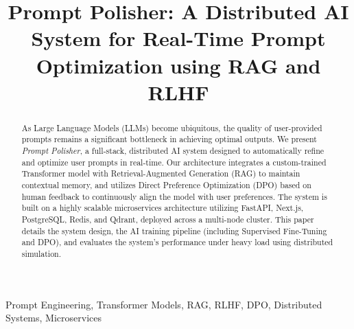 \documentclass[10pt, conference]{IEEEtran}
\begin{document}
\title{Prompt Polisher: A Distributed AI System for Real-Time Prompt Optimization using RAG and RLHF}

\author{
\and
{}
\and
{}
}

\maketitle

\begin{abstract}
As Large Language Models (LLMs) become ubiquitous, the quality of user-provided prompts remains a significant bottleneck in achieving optimal outputs. We present \textit{Prompt Polisher}, a full-stack, distributed AI system designed to automatically refine and optimize user prompts in real-time. Our architecture integrates a custom-trained Transformer model with Retrieval-Augmented Generation (RAG) to maintain contextual memory, and utilizes Direct Preference Optimization (DPO) based on human feedback to continuously align the model with user preferences. The system is built on a highly scalable microservices architecture utilizing FastAPI, Next.js, PostgreSQL, Redis, and Qdrant, deployed across a multi-node cluster. This paper details the system design, the AI training pipeline (including Supervised Fine-Tuning and DPO), and evaluates the system's performance under heavy load using distributed simulation.
\end{abstract}

\begin{IEEEkeywords}
Prompt Engineering, Transformer Models, RAG, RLHF, DPO, Distributed Systems, Microservices
\end{IEEEkeywords}
\end{document}

